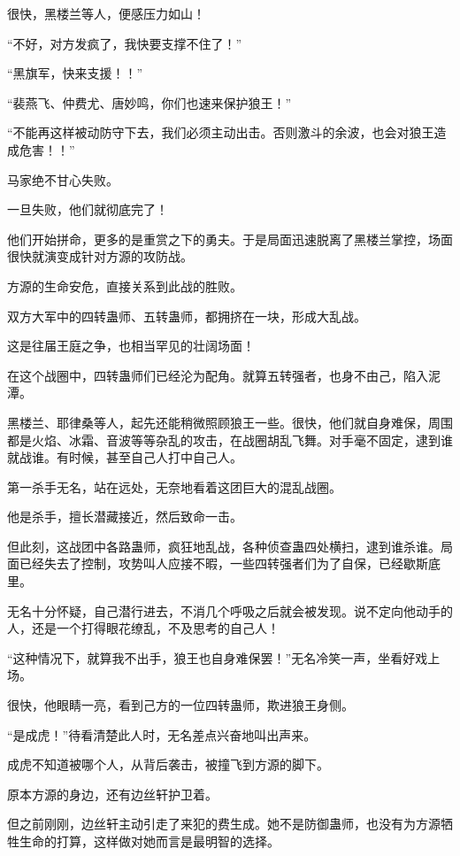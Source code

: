 
\begin{this_body}

很快，黑楼兰等人，便感压力如山！

“不好，对方发疯了，我快要支撑不住了！”

“黑旗军，快来支援！！”

“裴燕飞、仲费尤、唐妙鸣，你们也速来保护狼王！”

“不能再这样被动防守下去，我们必须主动出击。否则激斗的余波，也会对狼王造成危害！！”

马家绝不甘心失败。

一旦失败，他们就彻底完了！

他们开始拼命，更多的是重赏之下的勇夫。于是局面迅速脱离了黑楼兰掌控，场面很快就演变成针对方源的攻防战。

方源的生命安危，直接关系到此战的胜败。

双方大军中的四转蛊师、五转蛊师，都拥挤在一块，形成大乱战。

这是往届王庭之争，也相当罕见的壮阔场面！

在这个战圈中，四转蛊师们已经沦为配角。就算五转强者，也身不由己，陷入泥潭。

黑楼兰、耶律桑等人，起先还能稍微照顾狼王一些。很快，他们就自身难保，周围都是火焰、冰霜、音波等等杂乱的攻击，在战圈胡乱飞舞。对手毫不固定，逮到谁就战谁。有时候，甚至自己人打中自己人。

第一杀手无名，站在远处，无奈地看着这团巨大的混乱战圈。

他是杀手，擅长潜藏接近，然后致命一击。

但此刻，这战团中各路蛊师，疯狂地乱战，各种侦查蛊四处横扫，逮到谁杀谁。局面已经失去了控制，攻势叫人应接不暇，一些四转强者们为了自保，已经歇斯底里。

无名十分怀疑，自己潜行进去，不消几个呼吸之后就会被发现。说不定向他动手的人，还是一个打得眼花缭乱，不及思考的自己人！

“这种情况下，就算我不出手，狼王也自身难保罢！”无名冷笑一声，坐看好戏上场。

很快，他眼睛一亮，看到己方的一位四转蛊师，欺进狼王身侧。

“是成虎！”待看清楚此人时，无名差点兴奋地叫出声来。

成虎不知道被哪个人，从背后袭击，被撞飞到方源的脚下。

原本方源的身边，还有边丝轩护卫着。

但之前刚刚，边丝轩主动引走了来犯的费生成。她不是防御蛊师，也没有为方源牺牲生命的打算，这样做对她而言是最明智的选择。


\end{this_body}
